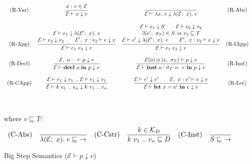 \documentclass[runningheads]{llncs}
\begin{document}
\begin{figure}$$
  \begin{array}{c c c c} 
    \text{(R-Var)}
    &
    \displaystyle
    \frac{x: v  \in \mathcal{E}}
         {\mathcal{E} \vdash x \downarrow v}
    &
    \displaystyle
    \frac{}
    {\mathcal{E} \vdash \lambda x. \ e \downarrow \lambda (\mathcal{E}; \ x). \ e}
    &
    \text{(R-Abs)}
    \\\\
    \text{(R-App)}
    &
    \displaystyle
    \frac{ \begin{matrix}
      \mathcal{E} \vdash e_1 \downarrow \lambda (\mathcal{E^\prime}; \ x). \ e \\
      \mathcal{E} \vdash e_2 \downarrow v_2 \quad \quad \mathcal{E}^\prime, \ x : v_2 \vdash e \downarrow v
    \end{matrix}}
         {\mathcal{E} \vdash e_1 \ e_2 \downarrow v}
    &
    \displaystyle
    \frac{ \begin{matrix}
      \mathcal{E} \vdash e_1 \downarrow S \quad \quad \mathcal{E} \vdash e_2 \downarrow v_2  \\
      \exists(e^\prime, \ \sigma_T) \in S  \Rightarrow v_2 \sqsubseteq T \\
      \mathcal{E} \vdash e^\prime \downarrow \lambda (\mathcal{E^\prime}; \ x). \ e  \quad \quad \mathcal{E}^\prime, \ x : v_2 \vdash e \downarrow v
    \end{matrix}}
         {\mathcal{E} \vdash e_1 \ e_2 \downarrow v}
    &
    \text{(R-IApp)}
    \\\\
    \text{(R-Decl)}
    &
    \displaystyle
    \frac{\mathcal{E}, \ o : \cdot \vdash p \downarrow v}
         {\mathcal{E} \vdash \textbf{decl} \ o \ \textbf{in} \ p \downarrow v}
    &
    \displaystyle
    \frac{\mathcal{E}(o) \uplus (e, \ \sigma_T) \vdash p \downarrow v}
         {\mathcal{E} \vdash \textbf{inst} \ o : \sigma_T = \ e \ \textbf{in} \ p \downarrow v}
    &
    \text{(R-Inst)}
    \\\\
    \text{(R-CApp)}
    &
    \displaystyle
    \frac{\mathcal{E} \vdash e_1 \downarrow v_1 \ .. \ \mathcal{E} \vdash e_1 \downarrow v_1}
         {\mathcal{E} \vdash k \ e_1 \ .. \ e_n \downarrow k \ v_1 \ .. \ v_n}
    &
    \displaystyle
    \frac{\mathcal{E} \vdash e^\prime \downarrow v^\prime \quad\quad \mathcal{E},\ x : v^\prime \vdash e \downarrow v}
         {\mathcal{E} \vdash \textbf{let} \ x = e^\prime \ \textbf{in} \ e \downarrow v}
    &
    \text{(R-Let)}
  \end{array}$$
  \\\\
  where $v \sqsubseteq T:$
  $$\begin{array}{c c c c c c} 
    \text{(C-Abs)}
    &
    \displaystyle
    \frac{}
         {\lambda (\mathcal{E}; \ x). \ e \sqsubseteq \ \rightarrow}
    &
    \text{(C-Cstr)}
    &
    \displaystyle
    \frac{k \in \mathcal{K}_D}
    {k \ v_1 \ .. \ v_n \sqsubseteq D}
    &
    \text{(C-Inst)}
    &
    \displaystyle
    \frac{}
    {S \sqsubseteq \ \rightarrow}
  \end{array}$$
  \caption{Big Step Semantics ($\mathcal{E} \vdash p \downarrow v$)} \label{semantics}
\end{figure}
\end{document}
